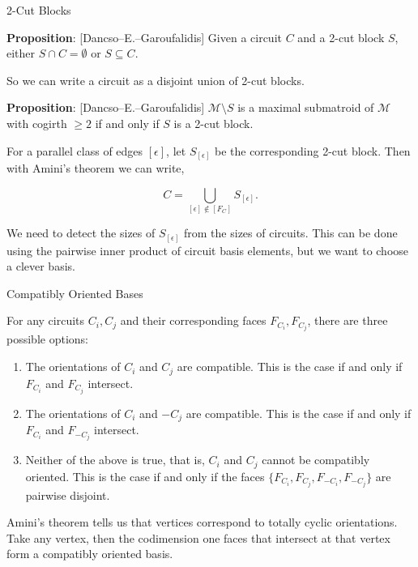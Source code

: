 \documentclass[9pt]{beamer}
\def\calM{\mathcal M}
\newcounter{proposition}
\newcommand{\proposition}[1]{\textbf{Proposition}: #1}
\begin{document}
    \begin{frame}{2-Cut Blocks}

        \proposition{[Dancso--E.--Garoufalidis] Given a circuit $C$ and a 2-cut block $S$, either $S\cap C=\emptyset$ or $S\subseteq C$.}

        \pause

        \vspace{12pt}

        So we can write a circuit as a disjoint union of 2-cut blocks.

        \pause

        \vspace{12pt}

        \proposition{[Dancso--E.--Garoufalidis] $\calM\setminus S$ is a maximal submatroid of $\calM$ with cogirth $\geq2$ if and only if $S$ is a 2-cut block.}

        \pause

        \vspace{12pt}
        
        For a parallel class of edges $[\epsilon]$, let $S_{[\epsilon]}$ be the corresponding 2-cut block.
        Then with Amini's theorem we can write,

        \[C=\bigcup_{[\epsilon]\not\in [F_C]} S_{[\epsilon]}.\]

        \pause

        \vspace{12pt}

        We need to detect the sizes of $S_{[\epsilon]}$ from the sizes of circuits.
        This can be done using the pairwise inner product of circuit basis elements, but we want to choose a clever basis.
        
    \end{frame}

    \begin{frame}{Compatibly Oriented Bases}

        For any circuits $C_i, C_j$ and their corresponding faces $F_{C_i}, F_{C_j}$, there are three possible options:\pause

        \begin{enumerate}
            \item The orientations of $C_i$ and $C_j$ are compatible.
            This is the case if and only if $F_{C_i}$ and $F_{C_j}$ intersect.\pause
            \item The orientations of $C_i$ and $-C_j$ are compatible.
            This is the case if and only if $F_{C_i}$ and $F_{-C_j}$ intersect.\pause
            \item Neither of the above is true, that is, $C_i$ and $C_j$ cannot be compatibly oriented.
            This is the case if and only if the faces $\{F_{C_i}, F_{C_j}, F_{-C_i}, F_{-C_j}\}$ are pairwise disjoint.\pause
        \end{enumerate}

        Amini's theorem tells us that vertices correspond to totally cyclic orientations.
        Take any vertex, then the codimension one faces that intersect at that vertex form a compatibly oriented basis.
        
    \end{frame}
\end{document}
